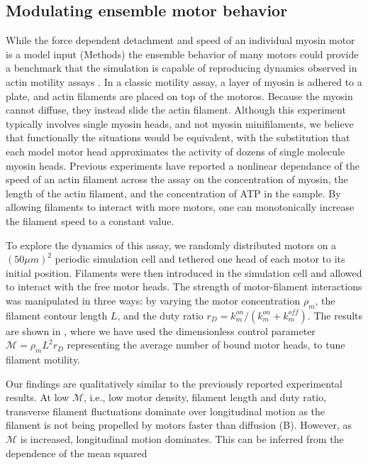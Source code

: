 \documentclass[12pt]{article}
\begin{document}
\subsection{Modulating ensemble motor behavior}
While the force dependent detachment and speed of an individual myosin motor is
a model input (Methods) the ensemble behavior of many motors could provide
a benchmark that the simulation is capable of reproducing dynamics observed in 
actin motility assays \cite{riveline1998, walcott2012}. In a classic motility
assay, a layer of myosin is adhered to a plate, and actin filaments
are placed on top of the motoros. Because the myosin cannot diffuse, they
instead slide the actin filament. Although this experiment
typically involves single myosin heads, and not myosin minifilaments, we believe
that functionally the situations would be equivalent, with the substitution that
each model motor head approximates the activity of dozens of single molecule
myosin heads. Previous experiments \cite{harris1993, umemoto1990} have reported
a nonlinear dependance of the speed of an actin filament across the assay on the
concentration of myosin, the length of the actin filament, and the concentration
of ATP in the sample. By allowing filaments to interact with more motors, one
can monotonically increase the filament speed to a constant value.
\par
To explore the dynamics of this assay, we randomly distributed motors on a
$(50\mu m)^2$ periodic simulation cell and tethered one head of each motor to
its initial position. Filaments were then introduced in the simulation cell and 
allowed to interact with the free motor heads. The strength of motor-filament
interactions was manipulated in three ways: by varying the motor concentration
$\rho_m$, the filament contour length $L$, and the duty ratio $r_D =k_m^{on}/(k_m^{on}+k_m^{off})$. 
The results are shown in , where we have used the
dimensionless control parameter $\mathcal{M} = \rho_m L^2 r_D$ representing the
average number of bound motor heads, to tune filament motility.
\par
Our findings are qualitatively similar to the previously reported experimental 
results. At low $\mathcal{M}$, i.e., low motor density, filament length and duty
ratio, transverse filament fluctuations dominate over longitudinal motion as
the filament is not being propelled by motors faster than diffusion
(B). However, as $\mathcal{M}$ is increased, longitudinal
motion dominates. This can be inferred from the dependence of the mean squared
\end{document}
